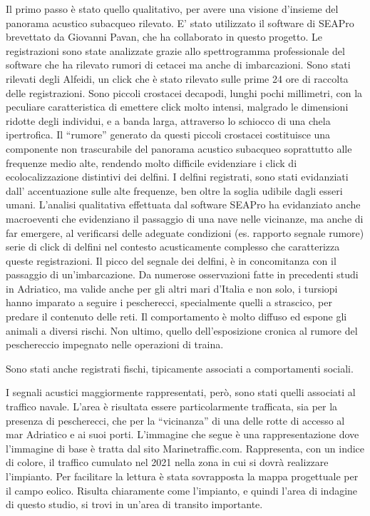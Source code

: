 Il primo passo è stato quello qualitativo, per avere una visione d’insieme del panorama acustico subacqueo rilevato.
E' stato utilizzato il software di SEAPro brevettato da Giovanni Pavan, che ha collaborato in questo progetto. 
Le registrazioni sono state analizzate grazie allo spettrogramma professionale del software che ha rilevato rumori di cetacei ma anche di imbarcazioni. 
Sono stati rilevati degli Alfeidi, un click che è stato rilevato sulle prime 24 ore di raccolta delle registrazioni. 
Sono piccoli crostacei decapodi, lunghi pochi millimetri, con la peculiare caratteristica di emettere click molto intensi, malgrado le dimensioni ridotte degli individui, e a banda larga, attraverso lo schiocco di una chela ipertrofica. %
Il “rumore” generato da questi piccoli crostacei costituisce una componente non trascurabile del panorama acustico subacqueo soprattutto alle frequenze medio alte, rendendo molto difficile evidenziare i click di ecolocalizzazione distintivi dei delfini.
I delfini registrati, sono stati evidanziati dall' accentuazione sulle alte frequenze, ben oltre la soglia udibile dagli esseri umani. 
L'analisi qualitativa effettuata dal software SEAPro ha evidanziato anche macroeventi che evidenziano il passaggio di una nave nelle vicinanze, ma anche di far emergere, al verificarsi delle adeguate condizioni (es. rapporto segnale rumore) serie di click di delfini nel contesto acusticamente complesso che caratterizza queste registrazioni. 
Il picco del segnale dei delfini, è in concomitanza con il passaggio di un'imbarcazione. 
Da numerose osservazioni fatte in precedenti studi in Adriatico, ma valide anche per gli altri mari d’Italia e non solo, i tursiopi hanno imparato a seguire i pescherecci, specialmente quelli a strascico, per predare il contenuto delle reti. 
Il comportamento è molto diffuso ed espone gli animali a diversi rischi. 
Non ultimo, quello dell’esposizione cronica al rumore del peschereccio impegnato nelle operazioni di traina.

Sono stati anche registrati fischi, tipicamente associati a comportamenti sociali. 

I segnali acustici maggiormente rappresentati, però, sono stati quelli associati al traffico navale. 
L’area è risultata essere particolarmente trafficata, sia per la presenza di pescherecci, che per la “vicinanza” di una delle rotte di accesso al mar Adriatico e ai suoi porti.
L’immagine che segue è una rappresentazione dove l’immagine di base è tratta dal sito Marinetraffic.com. 
Rappresenta, con un indice di colore, il traffico cumulato nel 2021 nella zona in cui si dovrà realizzare l’impianto. 
Per facilitare la lettura è stata sovrapposta la mappa progettuale per il campo eolico. 
Risulta chiaramente come l’impianto, e quindi l’area di indagine di questo studio, si trovi in un’area di transito importante. 

